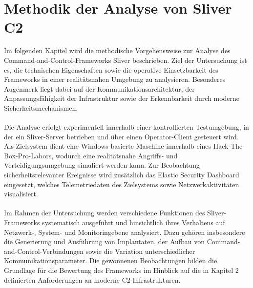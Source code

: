 \section{Methodik der Analyse von Sliver C2}
Im folgenden Kapitel wird die methodische Vorgehensweise zur Analyse des Command-and-Control-Frameworks Sliver beschrieben. Ziel der Untersuchung ist es, die technischen Eigenschaften sowie die operative Einsetzbarkeit des Frameworks in einer realitätsnahen Umgebung zu analysieren. Besonderes Augenmerk liegt dabei auf der Kommunikationsarchitektur, der Anpassungsfähigkeit der Infrastruktur sowie der Erkennbarkeit durch moderne Sicherheitsmechanismen.
\\\\
Die Analyse erfolgt experimentell innerhalb einer kontrollierten Testumgebung, in der ein Sliver-Server betrieben und über einen Operator-Client gesteuert wird. Als Zielsystem dient eine Windows-basierte Maschine innerhalb eines Hack-The-Box-Pro-Labors\cite{pro_labs}, wodurch eine realitätsnahe Angriffs- und Verteidigungsumgebung simuliert werden kann. Zur Beobachtung sicherheitsrelevanter Ereignisse wird zusätzlich das Elastic Security Dashboard eingesetzt, welches Telemetriedaten des Zielsystems sowie Netzwerkaktivitäten visualisiert.
\\\\
Im Rahmen der Untersuchung werden verschiedene Funktionen des Sliver-Frameworks systematisch ausgeführt und hinsichtlich ihres Verhaltens auf Netzwerk-, System- und Monitoringebene analysiert. Dazu gehören insbesondere die Generierung und Ausführung von Implantaten, der Aufbau von Command-and-Control-Verbindungen sowie die Variation unterschiedlicher Kommunikationsparameter. Die gewonnenen Beobachtungen bilden die Grundlage für die Bewertung des Frameworks im Hinblick auf die in Kapitel 2 definierten Anforderungen an moderne C2-Infrastrukturen.
